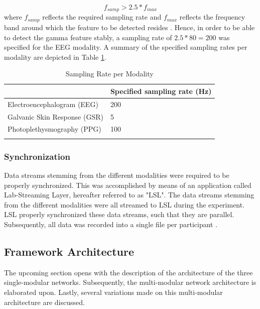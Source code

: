 \documentclass[12pt]{article}
\begin{document}
\begin{equation}
\label{eqn:nyquist}
f_{samp} > 2.5 * f_{max}
\end{equation}
where $f_{samp}$ reflects the required sampling rate and $f_{max}$ reflects the frequency band around which the feature to be detected resides \cite{srinivasan1998estimating}. Hence, in order to be able to detect the gamma feature stably, a sampling rate of $2.5*80=200$ was specified for the EEG modality. A summary of the specified sampling rates per modality are depicted in Table \ref{table:samplingrate}.

\bgroup
\def\arraystretch{1.6}%
\begin{table}[h]
\bigskip
\caption{Sampling Rate per Modality}
\label{table:samplingrate}
\begin{tabular}{ll}
    & Specified sampling rate (Hz) \\ \hline
 Electroencephalogram (EEG) & 200                         \\
Galvanic Skin Response (GSR) & 5                           \\
Photoplethysmography (PPG) & 100                         \\ \hline
   \bigskip
\end{tabular}
\end{table}
\egroup

\subsubsection{Synchronization}
Data streams stemming from the different modalities were required to be properly synchronized. This was accomplished by means of an application called Lab-Streaming Layer, hereafter referred to as "LSL". The data streams stemming from the different modalities were all streamed to LSL during the experiment. LSL properly synchronized these data streams, such that they are parallel. Subsequently, all data was recorded into a single file per participant \cite{kothe2018lab}.
\bigskip

\subsection{Framework Architecture}
The upcoming section opens with the description of the architecture of the three single-modular networks. Subsequently, the multi-modular network architecture is elaborated upon. Lastly, several variations made on this multi-modular architecture are discussed. 
\end{document}
